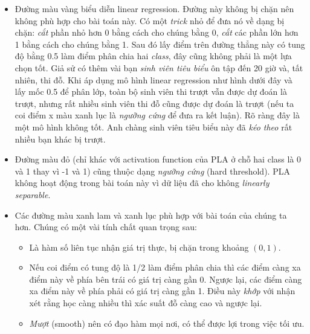 \begin{itemize}
    \item Đường màu vàng biểu diễn linear regression. Đường này không bị chặn nên không phù hợp cho bài toán này. Có một \textit{trick} nhỏ để đưa nó về dạng bị chặn: \textit{cắt} phần nhỏ hơn 0 bằng cách cho chúng bằng 0, \textit{cắt} các phần lớn hơn 1 bằng cách cho chúng bằng 1. Sau đó lấy điểm trên đường thẳng này có tung độ bằng 0.5 làm điểm phân chia hai \textit{class}, đây cũng không phải là một lựa chọn tốt. Giả sử có thêm vài bạn \textit{sinh viên tiêu biểu} ôn tập đến 20 giờ và, tất nhiên, thi đỗ. Khi áp dụng mô hình linear regression như hình dưới đây và lấy mốc 0.5 để phân lớp, toàn bộ sinh viên thi trượt vẫn được dự đoán là trượt, nhưng rất nhiều sinh viên thi đỗ cũng được dự đoán là trượt (nếu ta coi điểm x màu xanh lục là \textit{ngưỡng cứng} để đưa ra kết luận). Rõ ràng đây là một mô hình không tốt. Anh chàng sinh viên tiêu biểu này đã \textit{kéo theo} rất nhiều bạn khác bị trượt.
    
    \item Đường màu đỏ (chỉ khác với activation function của PLA ở chỗ  hai class là 0 và 1 thay vì -1 và 1) cũng thuộc dạng \textit{ngưỡng cứng} (hard threshold). PLA không hoạt động trong bài toán này vì dữ liệu đã cho không \textit{linearly separable}.  


    \item Các đường màu xanh lam và xanh lục phù hợp với bài toán của chúng ta hơn. Chúng có một vài tính chất quan trọng sau: 
    \begin{itemize}
        \item Là hàm số liên tục nhận giá trị thực, bị chặn trong khoảng $(0, 1)$. 

        \item Nếu coi điểm có tung độ là 1/2 làm điểm phân chia thì các điểm càng xa điểm này về phía bên trái có giá trị càng gần 0. Ngược lại, các điểm càng xa điểm này về phía phải có giá trị càng gần 1. Điều này \textit{khớp} với nhận xét rằng học càng nhiều thì xác suất đỗ càng cao và ngược lại.  

        \item \textit{Mượt} (smooth) nên có đạo hàm mọi nơi, có thể được lợi trong việc tối ưu. 
    \end{itemize}
 \end{itemize} 
     
